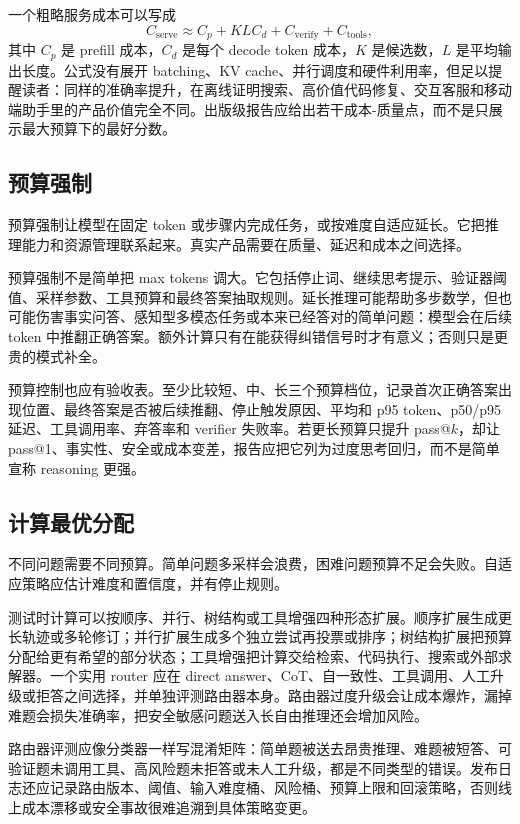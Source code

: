 \documentclass[UTF8,zihao=-4,openany]{ctexbook}
\begin{document}
一个粗略服务成本可以写成
\[
    C_{\mathrm{serve}} \approx C_p + K L C_d + C_{\mathrm{verify}} + C_{\mathrm{tools}},
\]
其中 $C_p$ 是 prefill 成本，$C_d$ 是每个 decode token 成本，$K$ 是候选数，$L$ 是平均输出长度。公式没有展开 batching、KV cache、并行调度和硬件利用率，但足以提醒读者：同样的准确率提升，在离线证明搜索、高价值代码修复、交互客服和移动端助手里的产品价值完全不同。出版级报告应给出若干成本-质量点，而不是只展示最大预算下的最好分数。

\subsection{预算强制}
预算强制让模型在固定 token 或步骤内完成任务，或按难度自适应延长。它把推理能力和资源管理联系起来。真实产品需要在质量、延迟和成本之间选择。

预算强制不是简单把 max tokens 调大。它包括停止词、继续思考提示、验证器阈值、采样参数、工具预算和最终答案抽取规则。延长推理可能帮助多步数学，但也可能伤害事实问答、感知型多模态任务或本来已经答对的简单问题：模型会在后续 token 中推翻正确答案。额外计算只有在能获得纠错信号时才有意义；否则只是更贵的模式补全。

预算控制也应有验收表。至少比较短、中、长三个预算档位，记录首次正确答案出现位置、最终答案是否被后续推翻、停止触发原因、平均和 p95 token、p50/p95 延迟、工具调用率、弃答率和 verifier 失败率。若更长预算只提升 pass@$k$，却让 pass@1、事实性、安全或成本变差，报告应把它列为过度思考回归，而不是简单宣称 reasoning 更强。

\subsection{计算最优分配}
不同问题需要不同预算。简单问题多采样会浪费，困难问题预算不足会失败。自适应策略应估计难度和置信度，并有停止规则。

测试时计算可以按顺序、并行、树结构或工具增强四种形态扩展。顺序扩展生成更长轨迹或多轮修订；并行扩展生成多个独立尝试再投票或排序；树结构扩展把预算分配给更有希望的部分状态；工具增强把计算交给检索、代码执行、搜索或外部求解器。一个实用 router 应在 direct answer、CoT、自一致性、工具调用、人工升级或拒答之间选择，并单独评测路由器本身。路由器过度升级会让成本爆炸，漏掉难题会损失准确率，把安全敏感问题送入长自由推理还会增加风险。

路由器评测应像分类器一样写混淆矩阵：简单题被送去昂贵推理、难题被短答、可验证题未调用工具、高风险题未拒答或未人工升级，都是不同类型的错误。发布日志还应记录路由版本、阈值、输入难度桶、风险桶、预算上限和回滚策略，否则线上成本漂移或安全事故很难追溯到具体策略变更。
\end{document}
